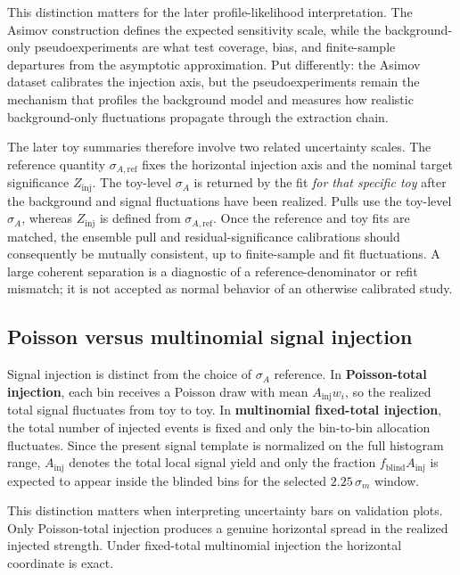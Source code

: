 This distinction matters for the later profile-likelihood interpretation. The Asimov
construction defines the expected sensitivity scale, while the background-only
pseudoexperiments are what test coverage, bias, and finite-sample departures from the
asymptotic approximation. Put differently: the Asimov dataset calibrates the injection
axis, but the pseudoexperiments remain the mechanism that profiles the background model
and measures how realistic background-only fluctuations propagate through the
extraction chain.

The later toy summaries therefore involve two related uncertainty scales. The reference
quantity $\sigma_{A,\mathrm{ref}}$ fixes the horizontal injection axis and the nominal
target significance $Z_{\mathrm{inj}}$. The toy-level $\sigma_A$ is returned by the fit
\emph{for that specific toy} after the background and signal fluctuations have been
realized. Pulls use the toy-level $\sigma_A$, whereas $Z_{\mathrm{inj}}$ is defined from
$\sigma_{A,\mathrm{ref}}$. Once the reference and toy fits are matched, the ensemble
pull and residual-significance calibrations should consequently be mutually
consistent, up to finite-sample and fit fluctuations. A large coherent separation is
a diagnostic of a reference-denominator or refit mismatch; it is not accepted as
normal behavior of an otherwise calibrated study.

\subsection{Poisson versus multinomial signal injection}

Signal injection is distinct from the choice of $\sigma_A$ reference. In
\textbf{Poisson-total injection}, each bin receives a Poisson draw with mean
$A_{\mathrm{inj}}w_i$, so the realized total signal fluctuates from toy to toy. In
\textbf{multinomial fixed-total injection}, the total number of injected events is
fixed and only the bin-to-bin allocation fluctuates. Since the present signal template
is normalized on the full histogram range, $A_{\mathrm{inj}}$ denotes the total local
signal yield and only the fraction $f_{\mathrm{blind}}A_{\mathrm{inj}}$ is expected to
appear inside the blinded bins for the selected $2.25\,\sigma_m$ window.

This distinction matters when interpreting uncertainty bars on validation plots. Only
Poisson-total injection produces a genuine horizontal spread in the realized injected
strength. Under fixed-total multinomial injection the horizontal coordinate is exact.

